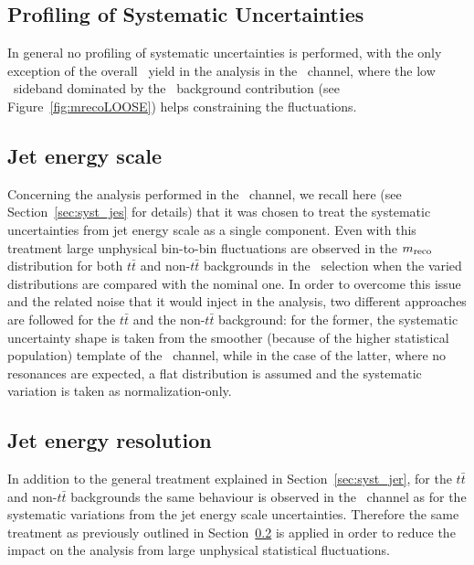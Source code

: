 \subsection{Profiling of Systematic Uncertainties}

In general no profiling of systematic uncertainties is performed, with
the only exception of the overall \ttbar\ yield in the analysis in the
\loose\ channel, where the low \mreco\ sideband dominated by the
\ttbar\ background contribution (see 
Figure~\ref{fig:mrecoLOOSE}) helps constraining the fluctuations.

\subsection{Jet energy scale}\label{sec:wbx_syst_jes}
Concerning the analysis performed in the \tight\ channel,
we recall here (see Section~\ref{sec:syst_jes} for details)
that it was chosen to treat the systematic uncertainties from
jet energy scale as a single component. Even with this treatment
large unphysical bin-to-bin fluctuations are observed
in the $m_{\rm reco}$ distribution for both $t\bar{t}$ and non-$t\bar{t}$
backgrounds in the \tight\ selection when the varied distributions
are compared with the nominal one. In order to overcome this issue
and the related noise that it would inject in the analysis, two different
approaches are followed for the $t\bar{t}$ and the non-$t\bar{t}$ background:
for the former, the systematic uncertainty shape is taken from the smoother
(because of the higher statistical population) template of the \loose\
channel, while in the case of the latter, where no resonances are expected,
a flat distribution is assumed and the systematic variation is taken as
normalization-only.

\subsection{Jet energy resolution}
In addition to the general treatment explained in Section~\ref{sec:syst_jer},
for the $t\bar{t}$ and non-$t\bar{t}$ backgrounds 
the same behaviour is observed in the \tight\ channel
as for the systematic variations from the jet energy scale uncertainties.
Therefore the same treatment as previously outlined in 
Section~\ref{sec:wbx_syst_jes} is applied in order to 
reduce the impact on the analysis from
large unphysical statistical fluctuations.

